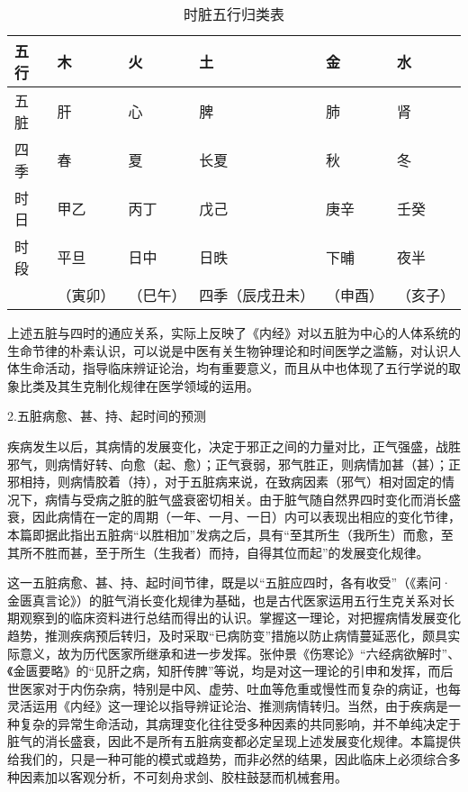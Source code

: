\documentclass[12pt]{ctexbook}
\begin{document}
\begin{table}[htb]%
	\centering
	\caption{时脏五行归类表}\label{tab:时脏五行归类表}
	\begin{tabu}to.87
		\toprule
		五行 & 木       & 火      & 土              & 金      & 水      \\
		\midrule
		五脏 & 肝       & 心      & 脾              & 肺      & 肾      \\
		四季 & 春       & 夏      & 长夏            & 秋      & 冬      \\
		时日 & 甲乙     & 丙丁    & 戊己            & 庚辛    & 壬癸    \\
		时段 & 平旦     & 日中    & 日昳            & 下晡    & 夜半    \\
			 & （寅卯） & （巳午）& 四季（辰戌丑未）& （申酉）& （亥子）\\
		\bottomrule
	\end{tabu}
\end{table}
上述五脏与四时的通应关系，实际上反映了《内经》对以五脏为中心的人体系统的生命节律的朴素认识，可以说是中医有关生物钟理论和时间医学之滥觞，对认识人体生命活动，指导临床辨证论治，均有重要意义，而且从中也体现了五行学说的取象比类及其生克制化规律在医学领域的运用。

2.五脏病愈、甚、持、起时间的预测

疾病发生以后，其病情的发展变化，决定于邪正之间的力量对比，正气强盛，战胜邪气，则病情好转、向愈（起、愈）；正气衰弱，邪气胜正，则病情加甚（甚）；正邪相持，则病情胶着（持），对于五脏病来说，在致病因素（邪气）相对固定的情况下，病情与受病之脏的脏气盛衰密切相关。由于脏气随自然界四时变化而消长盛衰，因此病情在一定的周期（一年、一月、一日）内可以表现出相应的变化节律，本篇即据此指出五脏病“以胜相加”发病之后，具有“至其所生（我所生）而愈，至其所不胜而甚，至于所生（生我者）而持，自得其位而起”的发展变化规律。

这一五脏病愈、甚、持、起时间节律，既是以“五脏应四时，各有收受”（《素问·金匮真言论》）的脏气消长变化规律为基础，也是古代医家运用五行生克关系对长期观察到的临床资料进行总结而得出的认识。掌握这一理论，对把握病情发展变化趋势，推测疾病预后转归，及时采取“已病防变”措施以防止病情蔓延恶化，颇具实际意义，故为历代医家所继承和进一步发挥。张仲景《伤寒论》“六经病欲解时”、《金匮要略》的“见肝之病，知肝传脾”等说，均是对这一理论的引申和发挥，而后世医家对于内伤杂病，特别是中风、虚劳、吐血等危重或慢性而复杂的病证，也每灵活运用《内经》这一理论以指导辨证论治、推测病情转归。当然，由于疾病是一种复杂的异常生命活动，其病理变化往往受多种因素的共同影响，并不单纯决定于脏气的消长盛衰，因此不是所有五脏病变都必定呈现上述发展变化规律。本篇提供给我们的，只是一种可能的模式或趋势，而非必然的结果，因此临床上必须综合多种因素加以客观分析，不可刻舟求剑、胶柱鼓瑟而机械套用。
\end{document}
